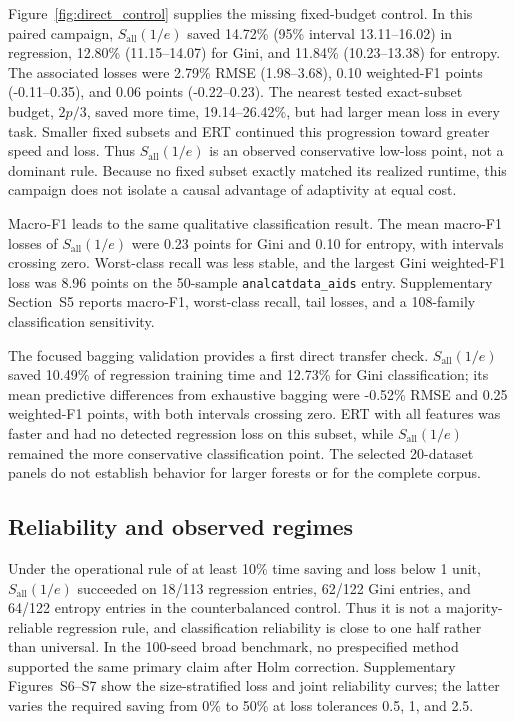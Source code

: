 \documentclass[final,5p,times,twocolumn]{elsarticle}
\begin{document}
Figure~\ref{fig:direct_control} supplies the missing fixed-budget control. In this paired campaign, \(S_{\mathrm{all}}(1/e)\) saved 14.72\% (95\% interval 13.11--16.02) in regression, 12.80\% (11.15--14.07) for Gini, and 11.84\% (10.23--13.38) for entropy. The associated losses were 2.79\% RMSE (1.98--3.68), 0.10 weighted-F1 points (-0.11--0.35), and 0.06 points (-0.22--0.23). The nearest tested exact-subset budget, \(2p/3\), saved more time, 19.14--26.42\%, but had larger mean loss in every task. Smaller fixed subsets and ERT continued this progression toward greater speed and loss. Thus \(S_{\mathrm{all}}(1/e)\) is an observed conservative low-loss point, not a dominant rule. Because no fixed subset exactly matched its realized runtime, this campaign does not isolate a causal advantage of adaptivity at equal cost.

Macro-F1 leads to the same qualitative classification result. The mean macro-F1 losses of \(S_{\mathrm{all}}(1/e)\) were 0.23 points for Gini and 0.10 for entropy, with intervals crossing zero. Worst-class recall was less stable, and the largest Gini weighted-F1 loss was 8.96 points on the 50-sample \texttt{analcatdata\_aids} entry. Supplementary Section~S5 reports macro-F1, worst-class recall, tail losses, and a 108-family classification sensitivity.



The focused bagging validation provides a first direct transfer check. \(S_{\mathrm{all}}(1/e)\) saved 10.49\% of regression training time and 12.73\% for Gini classification; its mean predictive differences from exhaustive bagging were -0.52\% RMSE and 0.25 weighted-F1 points, with both intervals crossing zero. ERT with all features was faster and had no detected regression loss on this subset, while \(S_{\mathrm{all}}(1/e)\) remained the more conservative classification point. The selected 20-dataset panels do not establish behavior for larger forests or for the complete corpus.

\subsection{Reliability and observed regimes}

Under the operational rule of at least 10\% time saving and loss below 1 unit, \(S_{\mathrm{all}}(1/e)\) succeeded on 18/113 regression entries, 62/122 Gini entries, and 64/122 entropy entries in the counterbalanced control. Thus it is not a majority-reliable regression rule, and classification reliability is close to one half rather than universal. In the 100-seed broad benchmark, no prespecified method supported the same primary claim after Holm correction. Supplementary Figures~S6--S7 show the size-stratified loss and joint reliability curves; the latter varies the required saving from 0\% to 50\% at loss tolerances 0.5, 1, and 2.5.
\end{document}
